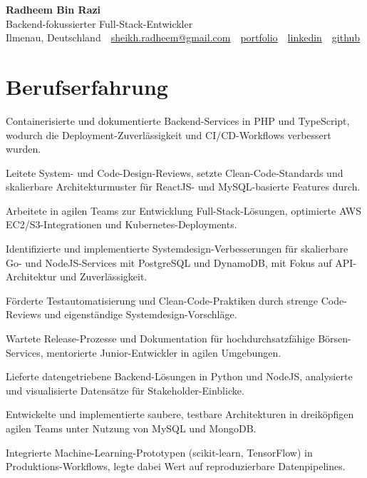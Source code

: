 \documentclass[11pt,a4paper]{resume}
\makeatletter
\newcommand{\Portfolio}{https://radheem.github.io/my-cv}
\newcommand{\PortfolioText}{portfolio}
\newcommand{\GitHub}{https://github.com/radheem}
\newcommand{\LinkedIn}{https://www.linkedin.com/in/radheem-razi}
\newcommand{\Email}{sheikh.radheem@gmail.com}
\makeatother
\begin{document}
\clearpage
{}

\begin{center}
  {\huge\bfseries Radheem Bin Razi}\\[3pt]
  {\large Backend-fokussierter Full-Stack-Entwickler}\\[6pt]
  \small
  Ilmenau, Deutschland \,\textbar\,
  \href{mailto:\Email}{\Email} \,\textbar\,
  \href{\Portfolio}{\PortfolioText} \,\textbar\,
  \href{\LinkedIn}{linkedin} \,\textbar\,
  \href{\GitHub}{github}
\end{center}
\vspace{2pt}

\section{Berufserfahrung}

\bullets
  \item Containerisierte und dokumentierte Backend-Services in PHP und TypeScript, wodurch die Deployment-Zuverlässigkeit und CI/CD-Workflows verbessert wurden.
  \item Leitete System- und Code-Design-Reviews, setzte Clean-Code-Standards und skalierbare Architekturmuster für ReactJS- und MySQL-basierte Features durch.
  \item Arbeitete in agilen Teams zur Entwicklung Full-Stack-Lösungen, optimierte AWS EC2/S3-Integrationen und Kubernetes-Deployments.
\bulletsend
\vspace{3pt}
\bullets
  \item Identifizierte und implementierte Systemdesign-Verbesserungen für skalierbare Go- und NodeJS-Services mit PostgreSQL und DynamoDB, mit Fokus auf API-Architektur und Zuverlässigkeit.
  \item Förderte Testautomatisierung und Clean-Code-Praktiken durch strenge Code-Reviews und eigenständige Systemdesign-Vorschläge.
  \item Wartete Release-Prozesse und Dokumentation für hochdurchsatzfähige Börsen-Services, mentorierte Junior-Entwickler in agilen Umgebungen.
\bulletsend
\vspace{3pt}
\bullets
  \item Lieferte datengetriebene Backend-Lösungen in Python und NodeJS, analysierte und visualisierte Datensätze für Stakeholder-Einblicke.
  \item Entwickelte und implementierte saubere, testbare Architekturen in dreiköpfigen agilen Teams unter Nutzung von MySQL und MongoDB.
  \item Integrierte Machine-Learning-Prototypen (scikit-learn, TensorFlow) in Produktions-Workflows, legte dabei Wert auf reproduzierbare Datenpipelines.
\bulletsend
\vspace{3pt}
\end{document}

